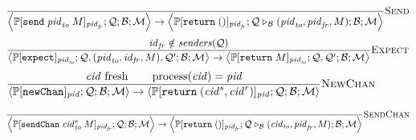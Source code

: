 \documentclass{article}
\newcommand{\sReturn}{\mathtt{return}}
\newcommand{\sExpect}{\mathtt{expect}}
\newcommand{\sSend}{\mathtt{send}}
\newcommand{\sNewChan}{\mathtt{newChan}}
\newcommand{\sSendChan}{\mathtt{sendChan}}
\DeclareMathOperator{\sProcessOf}{process}
\newcommand{\sExtend}[1]{\mathrel{\triangleright_{#1}}}
\newcommand{\sPid}{\ensuremath{\mathit{pid}}}
\newcommand{\sCid}{\ensuremath{\mathit{cid}}}
\newcommand{\sId}{\ensuremath{\mathit{id}}}
\newcommand{\sSystem}[4]{\left\langle #1 ; #2 ; #3 ; #4 \right\rangle}
\newcommand{\sQueue}{\mathcal{Q}}
\newcommand{\sBlacklist}{\mathcal{B}}
\newcommand{\sMonitors}{\mathcal{M}}
\newcommand{\sCtxt}[1]{\mathbb{#1}}
\newcommand{\sSenders}{\mathit{senders}}
\begin{document}
\begin{figure}
\small
\begin{equation*}
\frac{
}{
  \sSystem{\sCtxt{P}[ \sSend \; \sPid_\mathit{to} \; M ]_{\sPid_\mathit{fr}}}
          {\sQueue}
          {\sBlacklist}
          {\sMonitors}
\rightarrow 
  \sSystem{\sCtxt{P}[ \sReturn \; () ]_{\sPid_\mathit{fr}}}
          {\sQueue \sExtend{\sBlacklist} (\sPid_\mathit{to}, \sPid_\mathit{fr}, M)}
          {\sBlacklist}
          {\sMonitors}
} \textsc{Send}
\end{equation*}
%
\begin{equation*}
\frac{
  \sId_{\mathit{fr}} \notin \sSenders(\sQueue)
}{
  \sSystem{\sCtxt{P}[ \sExpect ]_{\sPid_\mathit{to}}}
          {\sQueue, (\sPid_\mathit{to}, \sId_\mathit{fr}, M), \sQueue'}
          {\sBlacklist}
          {\sMonitors}
\rightarrow
  \sSystem{\sCtxt{P}[ \sReturn \; M ]_{\sPid_\mathit{to}}}
          {\sQueue, \sQueue'}
          {\sBlacklist}
          {\sMonitors}
} \textsc{Expect}
\end{equation*}
%
\begin{equation*}
\frac{
  \sCid \text{ fresh}
\qquad
  \sProcessOf(\sCid) = \sPid
}{
  \sSystem{\sCtxt{P}[\sNewChan]_\sPid}
          {\sQueue}
          {\sBlacklist}
          {\sMonitors}
\rightarrow
  \sSystem{\sCtxt{P}[\sReturn \; (\sCid^s, \sCid^r)]_\sPid}
          {\sQueue}
          {\sBlacklist}
          {\sMonitors}
} \textsc{NewChan}
\end{equation*}

\begin{equation*}
\frac{
}{
  \sSystem{\sCtxt{P}[ \sSendChan \; \sCid_\mathit{to}^s \; M ]_{\sPid_\mathit{fr}}}
          {\sQueue}
          {\sBlacklist}
          {\sMonitors}
\rightarrow 
  \sSystem{\sCtxt{P}[ \sReturn \; () ]_{\sPid_\mathit{fr}}}
          {\sQueue \sExtend{\sBlacklist} (\sCid_\mathit{to}, \sPid_\mathit{fr}, M)}
          {\sBlacklist}
          {\sMonitors}
} \textsc{SendChan}
\end{equation*}


\end{figure}
\end{document}
